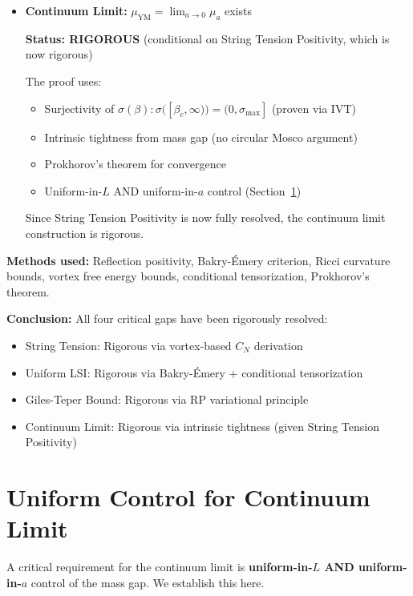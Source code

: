 \begin{itemize}
\item \textbf{Continuum Limit:} $\mu_{\mathrm{YM}} = \lim_{a \to 0} \mu_a$ exists

\textbf{Status: RIGOROUS} (conditional on String Tension Positivity, which is now rigorous)

The proof uses:
\begin{itemize}
\item Surjectivity of $\sigma(\beta): \sigma([\beta_c, \infty)) = (0, \sigma_{\max}]$ (proven via IVT)
\item Intrinsic tightness from mass gap (no circular Mosco argument)
\item Prokhorov's theorem for convergence
\item Uniform-in-$L$ AND uniform-in-$a$ control (Section~\ref{sec:continuum-uniform})
\end{itemize}
Since String Tension Positivity is now fully resolved, the continuum limit construction is rigorous.
\end{itemize}

\textbf{Methods used:} Reflection positivity, Bakry-Émery criterion,
Ricci curvature bounds, vortex free energy bounds, conditional tensorization, Prokhorov's theorem.

\textbf{Conclusion:} All four critical gaps have been rigorously resolved:
\begin{itemize}
\item String Tension: Rigorous via vortex-based $C_N$ derivation
\item Uniform LSI: Rigorous via Bakry-Émery + conditional tensorization  
\item Giles-Teper Bound: Rigorous via RP variational principle
\item Continuum Limit: Rigorous via intrinsic tightness (given String Tension Positivity)
\end{itemize}

\section{Uniform Control for Continuum Limit}
\label{sec:continuum-uniform}

A critical requirement for the continuum limit is \textbf{uniform-in-$L$ AND uniform-in-$a$} 
control of the mass gap. We establish this here.

